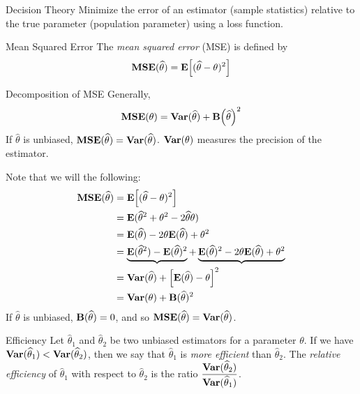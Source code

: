 \begin{df}{Decision Theory}
	Minimize the error of an estimator (sample statistics) relative to the true parameter (population parameter) using a loss function.
\end{df}
\begin{df}{Mean Squared Error}
	The \textit{mean squared error} (MSE) is defined by \[\vb{MSE}(\widehat\theta)=\vb{E}\qty[(\widehat\theta-\theta)^2]\]	
\end{df}
\begin{thm}{Decomposition of MSE}
	Generally, \[\vb{MSE}(\theta)=\vb{Var}(\widehat\theta)+\vb{B}\qty(\widehat\theta)^2\] If $\hat\theta$ is unbiased, $\vb{MSE}(\widehat\theta)=\vb{Var}(\widehat\theta)$. $\vb{Var}(\theta)$ measures the precision of the estimator. 
\end{thm}
\begin{prf}
	Note that we will the following: \begin{align*}
		\vb{MSE}(\widehat\theta)&=\vb{E}\qty[(\widehat\theta-\theta)^2]\\&=\vb{E}(\widehat\theta^2+\theta^2-2\widehat\theta\theta)\\&=\vb{E}(\widehat\theta)-2\theta\vb{E}(\widehat\theta)+\theta^2\\&=\underbrace{\vb{E}(\widehat\theta^2)-\vb{E}(\widehat\theta)^2}+\underbrace{\vb{E}(\widehat\theta)^2-2\theta\vb{E}(\widehat\theta)+\theta^2}\\&=\vb{Var}(\widehat\theta)+\qty[\vb{E}(\widehat\theta)-\theta]^2\\&=\vb{Var}(\theta)+\vb{B}(\widehat\theta)^2
	\end{align*}	
	If $\hat\theta$ is unbiased, $\vb{B}(\widehat\theta)=0$, and so $\vb{MSE}(\widehat\theta)=\vb{Var}(\widehat\theta)$.
\end{prf}
\begin{df}{Efficiency}
	Let $\hat\theta_1$ and $\hat\theta_2$ be two unbiased estimators for a parameter $\theta$. If we have $\vb{Var}(\widehat\theta_1)<\vb{Var}(\widehat\theta_2)$, then we say that $\hat\theta_1$ is \textit{more efficient} than $\hat\theta_2$. The \textit{relative efficiency} of $\hat\theta_1$ with respect to $\hat\theta_2$ is the ratio $\dfrac{\vb{Var}(\widehat\theta_2)}{\vb{Var}(\widehat\theta_1)}$.
\end{df}

